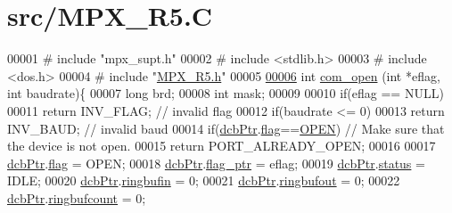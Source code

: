 \hypertarget{_m_p_x___r5_8_c_source}{
\section{src/MPX\_\-R5.C}
}

\begin{DoxyCode}
00001 \textcolor{preprocessor}{# include "mpx\_supt.h"}
00002 \textcolor{preprocessor}{# include <stdlib.h>} 
00003 \textcolor{preprocessor}{# include <dos.h>} 
00004 \textcolor{preprocessor}{# include "\hyperlink{_m_p_x___r5_8h}{MPX_R5.h}"}
00005 
\hypertarget{_m_p_x___r5_8_c_source_l00006}{}\hyperlink{_m_p_x___r5_8h_a4a6717eaeef77abf4f0604a3c91e26be}{00006}         \textcolor{keywordtype}{int} \hyperlink{_m_p_x___r5_8_c_a0f07dfc5a6bf6db22a31ba4f2e7d2f35}{com_open} (\textcolor{keywordtype}{int} *eflag, \textcolor{keywordtype}{int} baudrate)\{
00007                 \textcolor{keywordtype}{long} brd;
00008                 \textcolor{keywordtype}{int} mask;
00009 
00010                 \textcolor{keywordflow}{if}(eflag == NULL)
00011                         \textcolor{keywordflow}{return} INV\_FLAG; \textcolor{comment}{// invalid flag}
00012                 \textcolor{keywordflow}{if}(baudrate <= 0)
00013                         \textcolor{keywordflow}{return} INV\_BAUD;  \textcolor{comment}{// invalid baud}
00014                 \textcolor{keywordflow}{if}(\hyperlink{_m_p_x___r5_8h_acf6724d515070007ff4ac39c32640311}{dcbPtr}.\hyperlink{structdevice_ac2d4a1d39c1a5a858d88f2482d6900c8}{flag}==\hyperlink{_m_p_x___r5_8h_a1354b70ac6803a06beebe84f61b5f95b}{OPEN}) \textcolor{comment}{// Make sure that the device is not open.}
00015                         \textcolor{keywordflow}{return} PORT\_ALREADY\_OPEN;
00016 
00017                 \hyperlink{_m_p_x___r5_8h_acf6724d515070007ff4ac39c32640311}{dcbPtr}.\hyperlink{structdevice_ac2d4a1d39c1a5a858d88f2482d6900c8}{flag} = OPEN;
00018                 \hyperlink{_m_p_x___r5_8h_acf6724d515070007ff4ac39c32640311}{dcbPtr}.\hyperlink{structdevice_aa14e67b7bd4e2bc5751268f0be91983f}{flag_ptr} = eflag;
00019                 \hyperlink{_m_p_x___r5_8h_acf6724d515070007ff4ac39c32640311}{dcbPtr}.\hyperlink{structdevice_aaaefcdae0117d89bef5340a1e3f432e1}{status} = IDLE; 
00020                 \hyperlink{_m_p_x___r5_8h_acf6724d515070007ff4ac39c32640311}{dcbPtr}.\hyperlink{structdevice_a87b6f10cd47f45a38cfa264c298acc04}{ringbufin} = 0; 
00021                 \hyperlink{_m_p_x___r5_8h_acf6724d515070007ff4ac39c32640311}{dcbPtr}.\hyperlink{structdevice_ac5f863bd4d89e6182fb4c517d93afb8e}{ringbufout} = 0; 
00022                 \hyperlink{_m_p_x___r5_8h_acf6724d515070007ff4ac39c32640311}{dcbPtr}.\hyperlink{structdevice_ad06a8146a22a605c0f463b212774cc92}{ringbufcount} = 0;

\end{DoxyCode}
